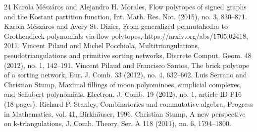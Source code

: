 \begin{thebibliography}{24}
 Karola Mészáros and Alejandro H. Morales, Flow polytopes of signed graphs and the Kostant partition function, Int. Math. Res. Not. (2015), no. 3, 830–871.
 Karola Mészáros and Avery St. Dizier, From generalized permutahedra to Grothendieck polynomials via flow polytopes, https://arxiv.org/abs/1705.02418, 2017.
 Vincent Pilaud and Michel Pocchiola, Multitriangulations, pseudotriangulations and primitive sorting networks, Discrete Comput. Geom. 48 (2012), no. 1, 142–191.
 Vincent Pilaud and Francisco Santos, The brick polytope of a sorting network, Eur. J. Comb. 33 (2012), no. 4, 632–662.
 Luis Serrano and Christian Stump, Maximal fillings of moon polyominoes, simplicial complexes, and Schubert polynomials, Electron. J. Comb. 19 (2012), no. 1, article ID P16 (18 pages).
 Richard P. Stanley, Combinatorics and commutative algebra, Progress in Mathematics, vol. 41, Birkhäuser, 1996.
 Christian Stump, A new perspective on k-triangulations, J. Comb. Theory, Ser. A 118 (2011), no. 6, 1794–1800.
\end{thebibliography}
